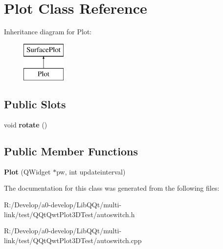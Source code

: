 \hypertarget{class_plot}{}\section{Plot Class Reference}
\label{class_plot}
Inheritance diagram for Plot\+:\begin{figure}[H]
\begin{center}
\leavevmode
\includegraphics[height=2.000000cm]{class_plot}
\end{center}
\end{figure}
\subsection*{Public Slots}
\begin{DoxyCompactItemize}
\item 
\mbox{\label{class_plot_a485748c2903af9dd5768bcbf6efe473c}} 
void {\bfseries rotate} ()
\end{DoxyCompactItemize}
\subsection*{Public Member Functions}
\begin{DoxyCompactItemize}
\item 
\mbox{\label{class_plot_aa3a9e51dc840bfe12b22918b92871ee7}} 
{\bfseries Plot} (Q\+Widget $\ast$pw, int updateinterval)
\end{DoxyCompactItemize}


The documentation for this class was generated from the following files\+:\begin{DoxyCompactItemize}
\item 
R\+:/\+Develop/a0-\/develop/\+Lib\+Q\+Qt/multi-\/link/test/\+Q\+Qt\+Qwt\+Plot3\+D\+Test/autoswitch.\+h\item 
R\+:/\+Develop/a0-\/develop/\+Lib\+Q\+Qt/multi-\/link/test/\+Q\+Qt\+Qwt\+Plot3\+D\+Test/autoswitch.\+cpp\end{DoxyCompactItemize}
